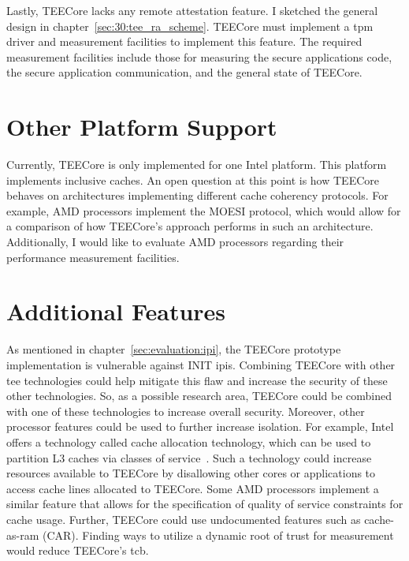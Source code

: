Lastly, TEECore lacks any remote attestation feature. I sketched the general
design in chapter~\ref{sec:30:tee_ra_scheme}. TEECore must implement a \gls{tpm}
driver and measurement facilities to implement this feature. The required
measurement facilities include those for measuring the secure applications code,
the secure application communication, and the general state of TEECore.

\section{Other Platform Support}
Currently, TEECore is only implemented for one Intel platform. This platform
implements inclusive caches. An open question at this point is how TEECore
behaves on architectures implementing different cache coherency protocols. For
example, AMD processors implement the MOESI protocol, which would allow for a
comparison of how TEECore's approach performs in such an architecture.
Additionally, I would like to evaluate AMD processors regarding their
performance measurement facilities.

\section{Additional Features}
As mentioned in chapter~\ref{sec:evaluation:ipi}, the TEECore prototype
implementation is vulnerable against INIT \glspl{ipi}. Combining TEECore with other
\gls{tee} technologies could help mitigate this flaw and increase the security
of these other technologies. So, as a possible research area, TEECore could be
combined with one of these technologies to increase overall security. Moreover,
other processor features could be used to further increase isolation. For
example, Intel offers a technology called cache allocation technology, which can
be used to partition L3 caches via classes of service~\cite{intel_cat}. Such a technology could
increase resources available to TEECore by disallowing other cores or
applications to access cache lines allocated to TEECore. Some AMD processors
implement a similar feature that allows for the specification of quality of
service constraints for cache usage. Further, TEECore could use undocumented
features such as cache-as-ram (CAR). Finding ways to utilize a dynamic root of
trust for measurement would reduce TEECore's \gls{tcb}.

